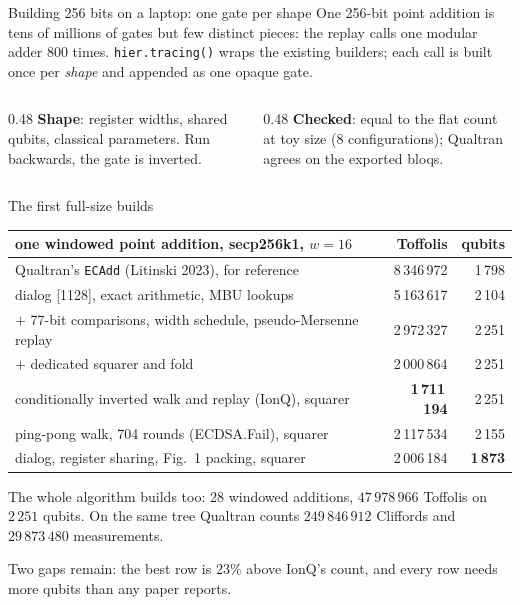 \documentclass[aspectratio=169,11pt]{beamer}
\newcommand{\code}[2][]{}
\begin{document}
\setcounter{framenumber}{171}
\begin{frame}[fragile]{Building 256 bits on a laptop: one gate per shape}
  \small One 256-bit point addition is tens of millions of gates but few distinct pieces: the replay calls one modular adder 800 times. \texttt{hier.tracing()} wraps the existing builders; each call is built once per \emph{shape} and appended as one opaque gate.\par
  \vskip1mm
  \code[basicstyle=\ttfamily\fontsize{7.6}{8.8}\selectfont]{boundary.py}
  \begin{columns}[T]
    \begin{column}{0.48\textwidth}
      {\small \textbf{Shape}: register widths, shared qubits, classical parameters. Run backwards, the gate is inverted.}
    \end{column}
    \begin{column}{0.48\textwidth}
      {\small \textbf{Checked}: equal to the flat count at toy size (8 configurations); Qualtran agrees on the exported bloqs.}
    \end{column}
  \end{columns}
\end{frame}

\setcounter{framenumber}{172}
\begin{frame}{The first full-size builds}
  \centering\footnotesize
  \renewcommand{\arraystretch}{1.12}
  \begin{tabular}{@{}lrr@{}}
    \toprule
    one windowed point addition, secp256k1, $w=16$ & Toffolis & qubits \\
    \midrule
    Qualtran's \texttt{ECAdd} (Litinski 2023), for reference & 8\,346\,972 & 1\,798 \\
    dialog [1128], exact arithmetic, MBU lookups & 5\,163\,617 & 2\,104 \\
    \quad $+$ 77-bit comparisons, width schedule, pseudo-Mersenne replay & 2\,972\,327 & 2\,251 \\
    \quad $+$ dedicated squarer and fold & 2\,000\,864 & 2\,251 \\
    conditionally inverted walk and replay (IonQ), squarer & \textbf{1\,711\,194} & 2\,251 \\
    ping-pong walk, 704 rounds (ECDSA.Fail), squarer & 2\,117\,534 & 2\,155 \\
    dialog, register sharing, Fig.~1 packing, squarer & 2\,006\,184 & \textbf{1\,873} \\
    \bottomrule
  \end{tabular}\par
  \vskip2mm
  \raggedright\small
  The whole algorithm builds too: 28 windowed additions, $47\,978\,966$ Toffolis on $2\,251$ qubits. On the same tree Qualtran counts $249\,846\,912$ Cliffords and $29\,873\,480$ measurements.
  \begin{takeaway}Two gaps remain: the best row is $23\%$ above IonQ's count, and every row needs more qubits than any paper reports.\end{takeaway}
\end{frame}
\end{document}
